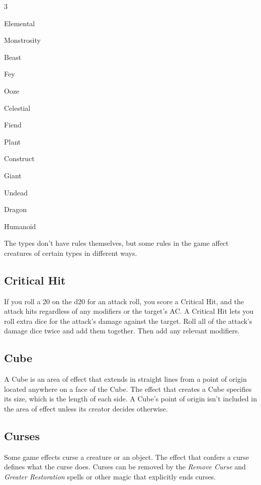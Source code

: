 \documentclass[10pt,a4paper,twoside,bg=print,twocolumn,openany,nodeprecatedcode]{dndarticle}
\begin{document}
\begin{description}
\dndsans
\begin{multicols}{3}
\item Elemental
\item Monstrosity
\item Beast
\item Fey
\item Ooze
\item Celestial
\item Fiend
\item Plant
\item Construct
\item Giant
\item Undead
\item Dragon
\item Humanoid
\end{multicols}

\end{description}

The types don't have rules themselves, but some rules in the game affect creatures of certain types in different ways.

\subsection{Critical Hit}
If you roll a 20 on the d20 for an attack roll, you score a Critical Hit, and the attack hits regardless of any modifiers or the target's AC. A Critical Hit lets you roll extra dice for the attack's damage against the target. Roll all of the attack's damage dice twice and add them together. Then add any relevant modifiers.

\subsection{Cube}
A Cube is an area of effect that extends in straight lines from a point of origin located anywhere on a face of the Cube. The effect that creates a Cube specifies its size, which is the length of each side. A Cube's point of origin isn't included in the area of effect unless its creator decides otherwise.

\subsection{Curses}
Some game effects curse a creature or an object. The effect that confers a curse defines what the curse does. Curses can be removed by the \textit{Remove Curse} and \textit{Greater Restoration} spells or other magic that explicitly ends curses.
\end{document}
